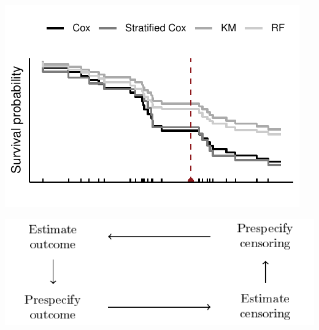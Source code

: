 \documentclass[a0,portrait]{a0poster}
\newcommand*\diff{\mathop{}\!\mathrm{d}}
\newcommand{\R}{\mathbb{R}}
\newcommand{\1}{\mathds{1}}
\begin{document}
\begin{minipage}{\textwidth}
\begin{minipage}[t]{1\linewidth}
\begin{multicols}{2}
\begin{minipage}[c]{0.5\linewidth}
  \includegraphics[width=.9\linewidth]{sl-hold-out-sample.pdf}
\end{minipage}
\begin{minipage}[c]{.5\linewidth}
\begin{center}
  \includegraphics[width=1\linewidth]{ipcw-circle.pdf}
\end{center}
\end{minipage}


\vfill\null\columnbreak






\end{multicols}
\end{minipage}
\end{minipage}
\end{document}
